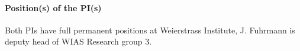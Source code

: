 \documentclass[a4paper,10pt]{article}
\begin{document}
\paragraph{Position(s) of the PI(s)}
Both PIs have full permanent positions at Weierstrass Institute, J. Fuhrmann is deputy head of WIAS Research group 3.
\end{document}
